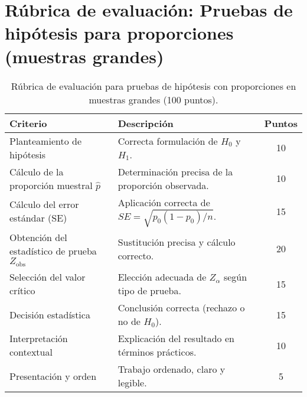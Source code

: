 
\section*{Rúbrica de evaluación: Pruebas de hipótesis para proporciones (muestras grandes)}
\begin{table}[H]
\centering
\begin{tabular}{p{} p{} c}
\toprule
\textbf{Criterio} & \textbf{Descripción} & \textbf{Puntos}\\
\midrule
Planteamiento de hipótesis & Correcta formulación de $H_0$ y $H_1$. & 10\\
Cálculo de la proporción muestral $\hat{p}$ & Determinación precisa de la proporción observada. & 10\\
Cálculo del error estándar (SE) & Aplicación correcta de $SE=\sqrt{p_0(1-p_0)/n}$. & 15\\
Obtención del estadístico de prueba $Z_{\text{obs}}$ & Sustitución precisa y cálculo correcto. & 20\\
Selección del valor crítico & Elección adecuada de $Z_{\alpha}$ según tipo de prueba. & 15\\
Decisión estadística & Conclusión correcta (rechazo o no de $H_0$). & 15\\
Interpretación contextual & Explicación del resultado en términos prácticos. & 10\\
Presentación y orden & Trabajo ordenado, claro y legible. & 5\\
\bottomrule
\end{tabular}
\caption{Rúbrica de evaluación para pruebas de hipótesis con proporciones en muestras grandes (100 puntos).}
\end{table}